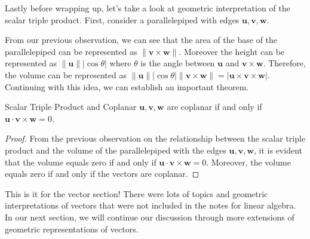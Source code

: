 \documentclass[../../../main.tex]{subfiles}
\begin{document}
Lastly before wrapping up, let's take a look at geometric
interpretation of the scalar triple product. First, consider
a parallelepiped with edges $\mathbf{u}, \mathbf{v}, \mathbf{w}$.

From our previous observation, we can see that the area of the
base of the parallelepiped can be represented as $\| \mathbf{v}
\times \mathbf{w} \|$. Moreover the height can be represented
as $\| \mathbf{u} \| | \cos\theta |$ where $\theta$ is the
angle between $\mathbf{u}$ and $\mathbf{v} \times \mathbf{w}$.
Therefore, the volume can be represented as $\| \mathbf{u} \|
| \cos\theta | \| \mathbf{v} \times \mathbf{w} \| = | \mathbf{u}
\times \mathbf{v} \times \mathbf{w} |$. Continuing with this
idea, we can establish an important theorem.

\begin{theorem}{}{Scalar Triple Product and Coplanar}
$\mathbf{u}, \mathbf{v}, \mathbf{w}$ are coplanar if and only
if $\mathbf{u} \cdot \mathbf{v} \times \mathbf{w} = 0$.
\end{theorem}
\begin{proof}
From the previous observation on the relationship between
the scalar triple product and the volume of the parallelepiped
with the edges $\mathbf{u}, \mathbf{v}, \mathbf{w}$, it is
evident that the volume equals zero if and only if
$\mathbf{u} \cdot \mathbf{v} \times \mathbf{w} = 0$. Moreover,
the volume equals zero if and only if the vectors are coplanar.
\end{proof}

This is it for the vector section! There were lots of topics and
geometric interpretations of vectors that were not included in the
notes for linear algebra. In our next section, we will continue
our discussion through more extensions of geometric representations
of vectors.
\end{document}

